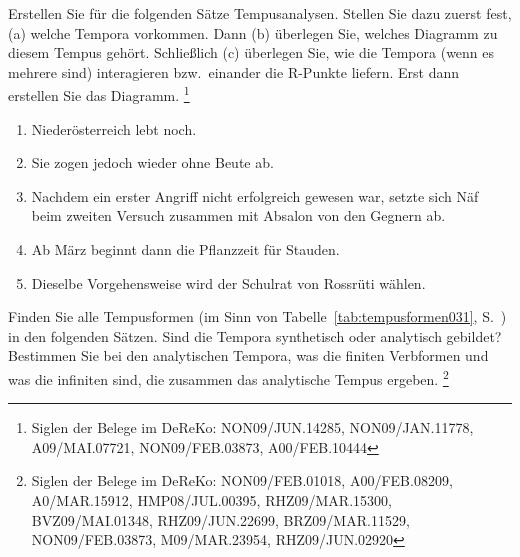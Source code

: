 \begin{sloppypar}

\Uebung[\onestar] \label{u91} Erstellen Sie für die folgenden Sätze Tempusanalysen.
Stellen Sie dazu zuerst fest, (a) welche Tempora vorkommen.
Dann (b) überlegen Sie, welches Diagramm zu diesem Tempus gehört.
Schließlich (c) überlegen Sie, wie die Tempora (wenn es mehrere sind) interagieren bzw.\ einander die R-Punkte liefern.
Erst dann erstellen Sie das Diagramm.
\footnote{Siglen der Belege im DeReKo: NON09\slash JUN.14285, NON09\slash JAN.11778, A09\slash MAI.07721, NON09\slash FEB.03873, A00\slash FEB.10444}

\begin{enumerate}
  \item Niederösterreich lebt noch.
  \item Sie zogen jedoch wieder ohne Beute ab.
  \item Nachdem ein erster Angriff nicht erfolgreich gewesen war, setzte sich Näf beim zweiten Versuch zusammen mit Absalon von den Gegnern ab.
  \item Ab März beginnt dann die Pflanzzeit für Stauden.
  \item Dieselbe Vorgehensweise wird der Schulrat von Rossrüti wählen.
\end{enumerate}

\Uebung[\onestar] \label{u92} Finden Sie alle Tempusformen (im Sinn von Tabelle~\ref{tab:tempusformen031}, S.~\pageref{tab:tempusformen031}) in den folgenden Sätzen.
Sind die Tempora synthetisch oder analytisch gebildet?
Bestimmen Sie bei den analytischen Tempora, was die finiten Verbformen und was die infiniten sind, die zusammen das analytische Tempus ergeben.%
\footnote{Siglen der Belege im DeReKo: NON09\slash FEB.01018, A00\slash FEB.08209, A0\slash MAR.15912, HMP08\slash JUL.00395, RHZ09\slash MAR.15300, BVZ09\slash MAI.01348, RHZ09\slash JUN.22699, BRZ09\slash MAR.11529, NON09\slash FEB.03873, M09\slash MAR.23954, RHZ09\slash JUN.02920}


\end{sloppypar}
